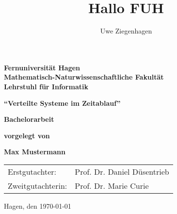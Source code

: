 \documentclass[12pt,ngerman,parskip=half]{scrreprt}
\title{Hallo FUH}
\author{Uwe Ziegenhagen}
\begin{document}
\begin{titlepage}
{\large\bfseries Fernuniversität Hagen \\
Mathematisch-Naturwissenschaftliche Fakultät \\
Lehrstuhl für Informatik}

\vspace*{5cm}
\begin{center}
{\LARGE\bfseries\enquote{Verteilte Systeme im Zeitablauf}}
\end{center}

\vspace*{1cm}
\begin{center}
{\Large\bfseries Bachelorarbeit}
\end{center}


\begin{center}
{\large\bfseries  vorgelegt von }
\end{center}

\begin{center}
{\Large\bfseries Max Mustermann}
\end{center}


\vfill
\begin{tabular}{ll}
Erstgutachter: & Prof. Dr. Daniel Düsentrieb \\
Zweitgutachterin: & Prof. Dr. Marie Curie \\
\end{tabular}

\hfill Hagen, den \today
\end{titlepage}



\tableofcontents

\listoffigures







\end{document}
